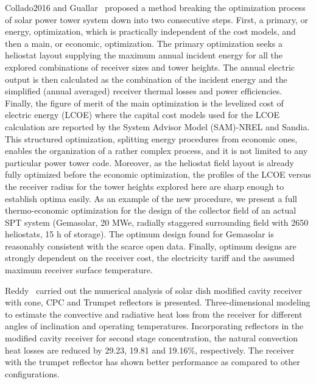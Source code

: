 Collado2016 and Guallar~\cite{Collado2016} proposed a method breaking the optimization process of solar power tower system down into two consecutive steps.
First, a primary, or energy, optimization, which is practically independent of the cost models, and then a main, or economic, optimization. The primary optimization seeks a heliostat layout supplying the maximum annual incident energy for all the explored combinations of receiver sizes and tower heights. The annual electric output is then calculated as the combination of the incident energy and the simplified (annual averaged) receiver thermal losses and power efficiencies. Finally, the figure of merit of the main optimization is the levelized cost of electric energy (LCOE) where the capital cost models used for the LCOE calculation are reported by the System Advisor Model (SAM)-NREL and Sandia. This structured optimization, splitting energy procedures from economic ones, enables the organization of a rather complex process, and it is not limited to any particular power tower code. Moreover, as the heliostat field layout is already fully optimized before the economic optimization, the profiles of the LCOE versus the receiver radius for the tower heights explored here are sharp enough to establish optima easily. As an example of the new procedure, we present a full thermo-economic optimization for the design of the collector field of an actual SPT system (Gemasolar, 20 MWe, radially staggered surrounding field with 2650 heliostats, 15 h of storage). The optimum design found for Gemasolar is reasonably consistent with the scarce open data. Finally, optimum designs are strongly dependent on the receiver cost, the electricity tariff and the assumed maximum receiver surface temperature.

Reddy~\cite{Reddy2009} carried out the numerical analysis of solar dish modified cavity receiver with cone, CPC and Trumpet reflectors is presented. Three-dimensional modeling to estimate the convective and radiative heat loss from the receiver for different angles of inclination and operating temperatures. Incorporating reflectors in the modified cavity receiver for second stage concentration, the natural convection heat losses are reduced by 29.23, 19.81 and 19.16\%, respectively. The receiver with the trumpet reflector has shown better performance as compared to other configurations.

